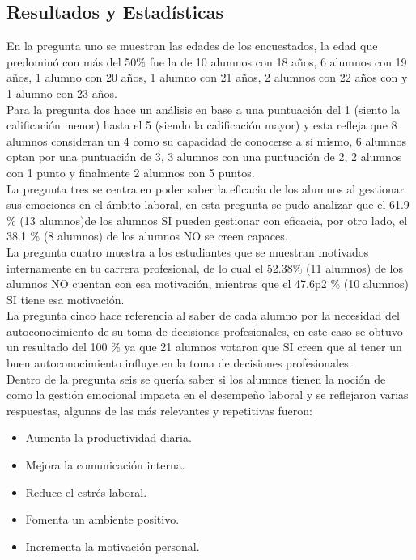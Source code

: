 \subsection{Resultados y Estad\'isticas}
En la pregunta uno se muestran las edades de los encuestados, la edad que predominó con más del
50\% fue la de 10 alumnos con 18 años, 6 alumnos con 19 años, 1 alumno con 20 años, 1 alumno con
21 años, 2 alumnos con 22 años con y 1 alumno con 23 años.\\
Para la pregunta dos hace un análisis en base a una puntuación del 1 (siento la calificación menor)
hasta el 5 (siendo la calificación mayor) y esta refleja que 8 alumnos consideran un 4 como su
capacidad de conocerse a sí mismo, 6 alumnos optan por una puntuación de 3, 3 alumnos con una
puntuación de 2, 2 alumnos con 1 punto y finalmente 2 alumnos con 5 puntos.\\
La pregunta tres se centra en poder saber la eficacia de los alumnos al gestionar sus emociones en el
ámbito laboral, en esta pregunta se pudo analizar que el 61.9 \% (13 alumnos)de los alumnos SI
pueden gestionar con eficacia, por otro lado, el 38.1 \% (8 alumnos) de los alumnos NO se creen
capaces.\\
La pregunta cuatro muestra a los estudiantes que se muestran motivados internamente en tu carrera
profesional, de lo cual el 52.38\% (11 alumnos) de los alumnos NO cuentan con esa motivación,
mientras que el 47.6p2 \% (10 alumnos) SI tiene esa motivación.\\
La pregunta cinco hace referencia al saber de cada alumno por la necesidad del autoconocimiento
de su toma de decisiones profesionales, en este caso se obtuvo un resultado del 100 \% ya que 21
alumnos votaron que SI creen que al tener un buen autoconocimiento influye en la toma de
decisiones profesionales.\\
Dentro de la pregunta seis se quería saber si los alumnos tienen la noción de como la gestión
emocional impacta en el desempeño laboral y se reflejaron varias respuestas, algunas de las más
relevantes y repetitivas fueron:
\begin{itemize}
\item Aumenta la productividad diaria.
\item Mejora la comunicación interna.
\item Reduce el estrés laboral.
\item Fomenta un ambiente positivo.
\item Incrementa la motivación personal.
\end{itemize}
